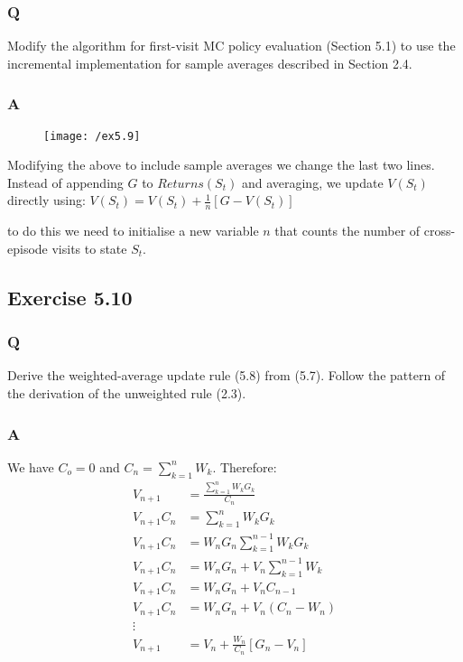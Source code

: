 \subsubsection{Q}
Modify the algorithm for first-visit MC policy evaluation (Section 5.1) to use the incremental implementation for sample averages described in Section 2.4. 
\subsubsection{A}
\begin{figure}[h!]
	\centering
	\texttt{[image: /ex5.9]}
	\label{fig:monte carlo policy eval}
\end{figure}

Modifying the above to include sample averages we change the last two lines. Instead of appending $G$ to $Returns(S_t)$ and averaging, we update $V(S_t)$ directly using:
$
V(S_t) = V(S_t) + \frac{1}{n}\left[G - V(S_t)\right]
$

to do this we need to initialise a new variable $n$ that counts the number of cross-episode visits to state $S_t$.

\subsection*{Exercise 5.10}
\subsubsection{Q}
Derive the weighted-average update rule (5.8) from (5.7). Follow the pattern of the derivation of the unweighted rule (2.3).
\subsubsection{A}
We have $C_o = 0$ and $C_n = \sum_{k=1}^{n} W_k$. Therefore:
\begin{align}
V_{n+1} &= \frac{\sum_{k=1}^{n}W_k G_k}{C_n}\\
V_{n+1}{C_n} &= \sum_{k=1}^{n}W_k G_k \\
V_{n+1}{C_n} &= W_n G_n \sum_{k=1}^{n-1}W_k G_k \\
V_{n+1}{C_n} &= W_n G_n + V_n \sum_{k=1}^{n-1}W_k \\
V_{n+1}{C_n} &= W_n G_n + V_n C_{n-1} \\
V_{n+1}{C_n} &= W_n G_n + V_n \left(C_n - W_n\right) \\
\vdots \\
V_{n+1} &= V_n + \frac{W_n}{C_n}\left[G_n - V_n\right] \\
\end{align}

